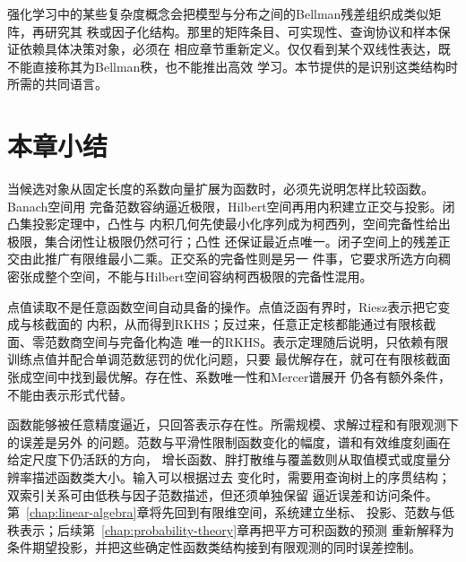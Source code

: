 强化学习中的某些复杂度概念会把模型与分布之间的Bellman残差组织成类似矩阵，再研究其
秩或因子化结构。那里的矩阵条目、可实现性、查询协议和样本保证依赖具体决策对象，必须在
相应章节重新定义。仅仅看到某个双线性表达，既不能直接称其为Bellman秩，也不能推出高效
学习。本节提供的是识别这类结构时所需的共同语言。

\section{本章小结}
\label{sec:functional-analysis-approximation-summary}

当候选对象从固定长度的系数向量扩展为函数时，必须先说明怎样比较函数。Banach空间用
完备范数容纳逼近极限，Hilbert空间再用内积建立正交与投影。闭凸集投影定理中，凸性与
内积几何先使最小化序列成为柯西列，空间完备性给出极限，集合闭性让极限仍然可行；凸性
还保证最近点唯一。闭子空间上的残差正交由此推广有限维最小二乘。正交系的完备性则是另一
件事，它要求所选方向稠密张成整个空间，不能与Hilbert空间容纳柯西极限的完备性混用。

点值读取不是任意函数空间自动具备的操作。点值泛函有界时，Riesz表示把它变成与核截面的
内积，从而得到RKHS；反过来，任意正定核都能通过有限核截面、零范数商空间与完备化构造
唯一的RKHS。表示定理随后说明，只依赖有限训练点值并配合单调范数惩罚的优化问题，只要
最优解存在，就可在有限核截面张成空间中找到最优解。存在性、系数唯一性和Mercer谱展开
仍各有额外条件，不能由表示形式代替。

函数能够被任意精度逼近，只回答表示存在性。所需规模、求解过程和有限观测下的误差是另外
的问题。范数与平滑性限制函数变化的幅度，谱和有效维度刻画在给定尺度下仍活跃的方向，
增长函数、胖打散维与覆盖数则从取值模式或度量分辨率描述函数类大小。输入可以根据过去
变化时，需要用查询树上的序贯结构；双索引关系可由低秩与因子范数描述，但还须单独保留
逼近误差和访问条件。第~\ref{chap:linear-algebra}章将先回到有限维空间，系统建立坐标、
投影、范数与低秩表示；后续第~\ref{chap:probability-theory}章再把平方可积函数的预测
重新解释为条件期望投影，并把这些确定性函数类结构接到有限观测的同时误差控制。
